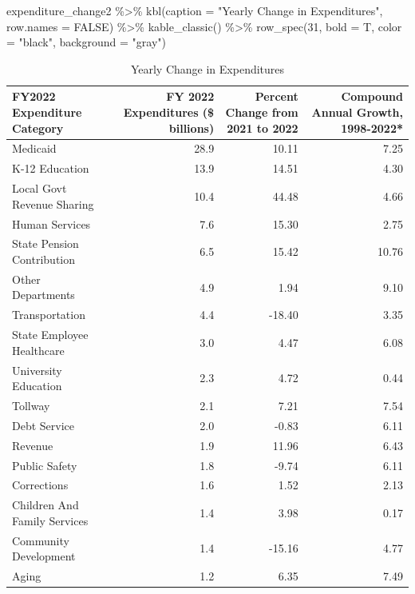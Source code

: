 \documentclass[
  letterpaper,
  DIV=11,
  numbers=noendperiod]{scrreport}
\newenvironment{Shaded}{\begin{snugshade}}{\end{snugshade}}
\newcommand{\AttributeTok}[1]{\textcolor[rgb]{0.40,0.45,0.13}{#1}}
\newcommand{\ConstantTok}[1]{\textcolor[rgb]{0.56,0.35,0.01}{#1}}
\newcommand{\DecValTok}[1]{\textcolor[rgb]{0.68,0.00,0.00}{#1}}
\newcommand{\FunctionTok}[1]{\textcolor[rgb]{0.28,0.35,0.67}{#1}}
\newcommand{\NormalTok}[1]{\textcolor[rgb]{0.00,0.23,0.31}{#1}}
\newcommand{\SpecialCharTok}[1]{\textcolor[rgb]{0.37,0.37,0.37}{#1}}
\newcommand{\StringTok}[1]{\textcolor[rgb]{0.13,0.47,0.30}{#1}}
\begin{document}
\begin{Shaded}
\begin{Highlighting}[]
\NormalTok{expenditure\_change2 }\SpecialCharTok{\%\textgreater{}\%} 
  \FunctionTok{kbl}\NormalTok{(}\AttributeTok{caption =} \StringTok{"Yearly Change in Expenditures"}\NormalTok{, }\AttributeTok{row.names =} \ConstantTok{FALSE}\NormalTok{) }\SpecialCharTok{\%\textgreater{}\%} 
  \FunctionTok{kable\_classic}\NormalTok{() }\SpecialCharTok{\%\textgreater{}\%}
    \FunctionTok{row\_spec}\NormalTok{(}\DecValTok{31}\NormalTok{, }\AttributeTok{bold =}\NormalTok{ T, }\AttributeTok{color =} \StringTok{"black"}\NormalTok{, }\AttributeTok{background =} \StringTok{"gray"}\NormalTok{)}
\end{Highlighting}
\end{Shaded}

\begin{table}

\caption{Yearly Change in Expenditures}
\centering
\begin{tabular}[t]{l|r|r|r}
\hline
FY2022 Expenditure Category & FY 2022 Expenditures (\$ billions) & Percent Change from 2021 to 2022 & Compound Annual Growth, 1998-2022*\\
\hline
Medicaid & 28.9 & 10.11 & 7.25\\
\hline
K-12 Education & 13.9 & 14.51 & 4.30\\
\hline
Local Govt Revenue Sharing & 10.4 & 44.48 & 4.66\\
\hline
Human Services & 7.6 & 15.30 & 2.75\\
\hline
State Pension Contribution & 6.5 & 15.42 & 10.76\\
\hline
Other Departments & 4.9 & 1.94 & 9.10\\
\hline
Transportation & 4.4 & -18.40 & 3.35\\
\hline
State Employee Healthcare & 3.0 & 4.47 & 6.08\\
\hline
University Education & 2.3 & 4.72 & 0.44\\
\hline
Tollway & 2.1 & 7.21 & 7.54\\
\hline
Debt Service & 2.0 & -0.83 & 6.11\\
\hline
Revenue & 1.9 & 11.96 & 6.43\\
\hline
Public Safety & 1.8 & -9.74 & 6.11\\
\hline
Corrections & 1.6 & 1.52 & 2.13\\
\hline
Children And Family Services & 1.4 & 3.98 & 0.17\\
\hline
Community Development & 1.4 & -15.16 & 4.77\\
\hline
Aging & 1.2 & 6.35 & 7.49\\

\end{tabular}
\end{table}
\end{document}
